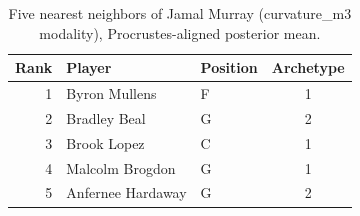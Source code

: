 \begin{table}[htbp]
  \centering\small
  \begin{tabular}{rllc}
    \toprule
    Rank & Player & Position & Archetype \\
    \midrule
    1 & Byron Mullens & F & 1 \\
    2 & Bradley Beal & G & 2 \\
    3 & Brook Lopez & C & 1 \\
    4 & Malcolm Brogdon & G & 1 \\
    5 & Anfernee Hardaway & G & 2 \\
    \bottomrule
  \end{tabular}
  \caption{Five nearest neighbors of Jamal Murray (curvature_m3 modality), Procrustes-aligned posterior mean.}
  \label{tab:Jamal_Murray_neighbors_curvature_m3}
\end{table}

